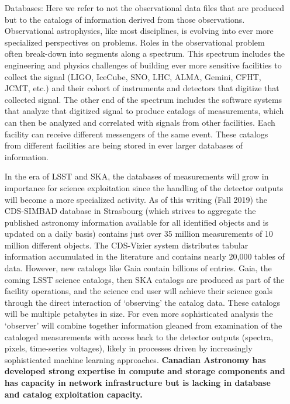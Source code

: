 \documentclass[11pt]{article}
\begin{document}
\begin{itemize}
    \item[Databases:] Here we refer to not the observational data files that are produced but to the catalogs of information derived from those observations.  Observational astrophysics, like most disciplines, is evolving into ever more specialized perspectives on problems. Roles in the observational problem often break-down into segments along a spectrum.  This spectrum includes the engineering and physics challenges of building ever more sensitive facilities to collect the signal (LIGO, IceCube, SNO, LHC, ALMA, Gemini, CFHT, JCMT, etc.) and their cohort of instruments and detectors that digitize that collected signal.  The other end of the spectrum includes the software systems that analyze that digitized signal to produce catalogs of measurements, which can then be analyzed and correlated with signals from other facilities.  Each facility can receive different messengers of the same event. These catalogs from different facilities are being stored in ever larger databases of information. 
    
    In the era of LSST and SKA, the databases of measurements will grow in importance for science exploitation since the handling of the detector outputs will become a more specialized activity.
    As of this writing (Fall 2019) the CDS-SIMBAD database in Strasbourg (which strives to aggregate the published astronomy information available for all identified objects and is updated on a daily basis) contains just over 35 million measurements of 10 million different objects.  The CDS-Vizier system distributes tabular information accumulated in the literature and contains nearly 20,000 tables of data.  However, new catalogs like Gaia contain billions of entries.  Gaia, the coming LSST science catalogs, then SKA catalogs are produced as part of the facility operations, and the science end user will achieve their science goals through the direct interaction of `observing' the catalog data.  These catalogs will be multiple petabytes in size.  For even more sophisticated analysis the `observer' will combine together information gleaned from examination of the cataloged measurements with access back to the detector outputs (spectra, pixels, time-series voltages), likely in processes driven by increasingly sophisticated machine learning approaches.  {\bf Canadian Astronomy has developed strong expertise in compute and storage components and has capacity in network infrastructure but is lacking in database and catalog exploitation capacity. } 
 

\end{itemize}
\end{document}
